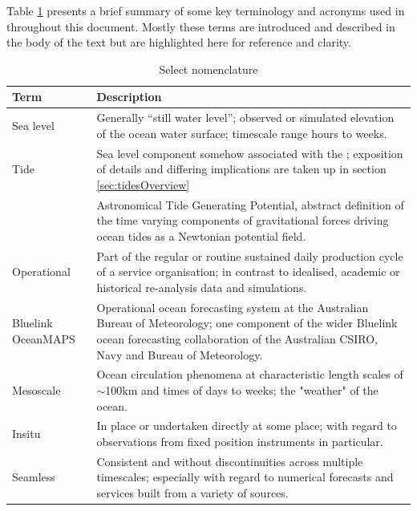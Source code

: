 Table \ref{table:jargon} presents a brief summary of some key terminology and acronyms used in throughout this document.   Mostly these terms are introduced and described in the body of the text but are highlighted here for reference and clarity.
\begin{table}[h]\centering
    \begin{tabular}{ |p{3cm}|p{11cm}| }
    \hline
    Term & Description  \\
    \hline
    Sea level & Generally ``still water level''; observed or simulated elevation of the ocean water surface; timescale range hours to weeks.\\
    \hline
    Tide & Sea level component somehow associated with the \ATGP{}; exposition of details and differing implications are taken up in section \ref{sec:tidesOverview}\\
    \hline
    \ATGP{} & Astronomical Tide Generating Potential, abstract definition of the time varying components of gravitational forces driving ocean tides as a Newtonian potential field.\\
    \hline
    Operational & Part of the regular or routine sustained daily production cycle of a service organisation;  in contrast to idealised, academic or historical re-analysis data and simulations.\\
    \hline
    Bluelink OceanMAPS & Operational ocean forecasting system at the Australian Bureau of Meteorology; one component of the wider Bluelink ocean forecasting collaboration of the Australian CSIRO, Navy and Bureau of Meteorology.\\
    \hline
    Mesoscale & Ocean circulation phenomena at characteristic length scales of $\sim$100km and times of days to weeks; the "weather" of the ocean.\\
    \hline
    Insitu & In place or undertaken directly at some place; with regard to observations from fixed position instruments in particular. \\
    \hline
    Seamless &  Consistent and without discontinuities across multiple timescales; especially with regard to numerical forecasts and services built from a variety of sources. \\
    \hline
    \end{tabular}
    \caption{Select nomenclature}
    \label{table:jargon}
\end{table}


